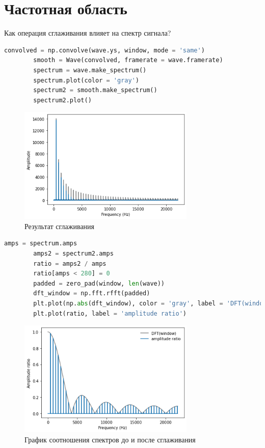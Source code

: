 \documentclass[a4paper, 12pt]{report}
\begin{document}
	\chapter{Частотная область}
	Как операция сглаживания влияет на спектр сигнала?
	\begin{lstlisting}[language=Python,caption=Сравнение исходного и сглаженного сигнала]
		convolved = np.convolve(wave.ys, window, mode = 'same')
		smooth = Wave(convolved, framerate = wave.framerate)
		spectrum = wave.make_spectrum()
		spectrum.plot(color = 'gray')
		spectrum2 = smooth.make_spectrum()
		spectrum2.plot()
	\end{lstlisting}
	\begin{figure}[H]
		\centering
		\includegraphics[width=0.75\textwidth]{test8.png}
		\caption{Результат сглаживания}
		\label{fig:test8}
	\end{figure}
	\begin{lstlisting}[language=Python,caption=Соотношение спектров сигнала до и после сглаживания]
		amps = spectrum.amps
		amps2 = spectrum2.amps
		ratio = amps2 / amps    
		ratio[amps < 280] = 0
		padded = zero_pad(window, len(wave))
		dft_window = np.fft.rfft(padded)
		plt.plot(np.abs(dft_window), color = 'gray', label = 'DFT(window)')
		plt.plot(ratio, label = 'amplitude ratio')
	\end{lstlisting}
	\begin{figure}[H]
		\centering
		\includegraphics[width=0.75\textwidth]{test9.png}
		\caption{График соотношения спектров до и после сглаживания}
		\label{fig:test9}
	\end{figure}
\end{document}
